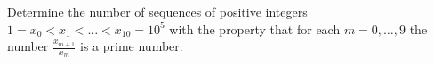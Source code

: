 Determine the number of sequences of positive integers $1 = x_0 < x_1 < \dots < x_{10} = 10^{5}$ with the property that for each $m=0,\dots,9$ the number $\frac{x_{m+1}}{x_m}$ is a prime number.
